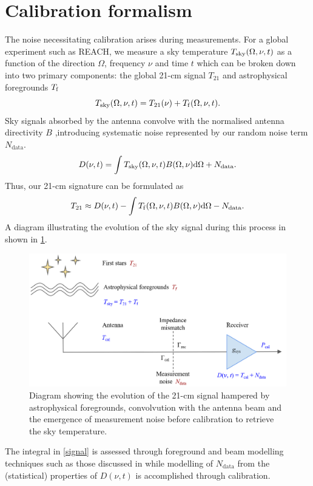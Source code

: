 \section{Calibration formalism}\label{sec:formalism}
The noise necessitating calibration arises during measurements. For a global experiment such as REACH, we measure a sky temperature $T_{\mathrm{sky}}(\Omega, \nu, t)$ as a function of the direction $\Omega$, frequency $\nu$ and time $t$ which can be broken down into two primary components: the global 21-cm signal $T_{21}$ and astrophysical foregrounds $T_{\mathrm{f}}$
\begin{equation}
    \label{tsky}
    T_{\mathrm{sky}}(\Omega, \nu, t) = T_{21}(\nu) + T_{\mathrm{f}}(\Omega, \nu, t).
\end{equation}
Sky signals absorbed by the antenna convolve with the normalised antenna directivity $B$ ,introducing systematic noise represented by our random noise term $N_{\mathrm{data}}$.
\begin{equation}\label{bayestsource}
    D(\nu, t) = \int T_{\mathrm{sky}}(\Omega, \nu, t) B(\Omega, \nu)\mathrm{d}\Omega + N_{\mathrm{data}}.
\end{equation}
Thus, our 21-cm signature can be formulated as
\begin{equation}\label{signal}
  T_{21} \approx D(\nu, t) - \int T_{\mathrm{f}}(\Omega, \nu, t)B(\Omega, \nu)\mathrm{d}\Omega - N_{\mathrm{data}}.
\end{equation}
A diagram illustrating the evolution of the sky signal during this process in shown in \cref{fig:nsfig}.
\begin{figure}
    \centering
    \includegraphics[width=.7\textwidth]{nsdiag}
    \caption{Diagram showing the evolution of the 21-cm signal hampered by astrophysical foregrounds, convolvution with the antenna beam and the emergence of measurement noise before calibration to retrieve the sky temperature.}
    \label{fig:nsfig}
\end{figure}
The integral in \cref{signal} is assessed through foreground and beam modelling techniques such as those discussed in \citet{dom} while modelling of $N_{\mathrm{data}}$ from the (statistical) properties of $D(\nu, t)$ is accomplished through calibration.


